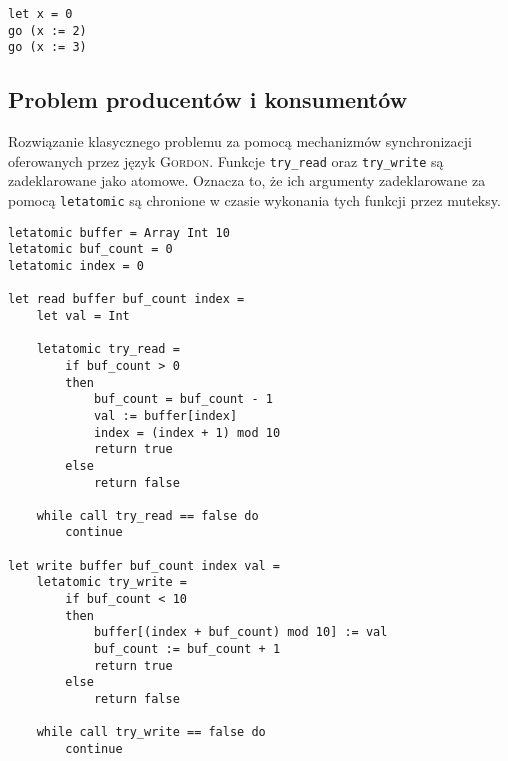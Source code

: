 \documentclass{documentation}
\begin{document}
\begin{verbatim}
let x = 0
go (x := 2)
go (x := 3)
\end{verbatim}


\subsection{Problem producentów i konsumentów}
\noindent Rozwiązanie klasycznego problemu za pomocą mechanizmów synchronizacji
oferowanych przez język \textsc{Gordon}. Funkcje \texttt{try\_read} oraz
\texttt{try\_write} są zadeklarowane jako atomowe. Oznacza to, że ich argumenty
zadeklarowane za pomocą \texttt{letatomic} są chronione w czasie wykonania tych
funkcji przez muteksy.

\begin{verbatim}
letatomic buffer = Array Int 10
letatomic buf_count = 0
letatomic index = 0

let read buffer buf_count index = 
    let val = Int

    letatomic try_read =
        if buf_count > 0
        then
            buf_count = buf_count - 1
            val := buffer[index]
            index = (index + 1) mod 10
            return true
        else
            return false
        
    while call try_read == false do
        continue

let write buffer buf_count index val =
    letatomic try_write =
        if buf_count < 10
        then
            buffer[(index + buf_count) mod 10] := val
            buf_count := buf_count + 1
            return true
        else
            return false

    while call try_write == false do
        continue

\end{verbatim}


\begin{verbatim}

\end{verbatim}
\end{document}
